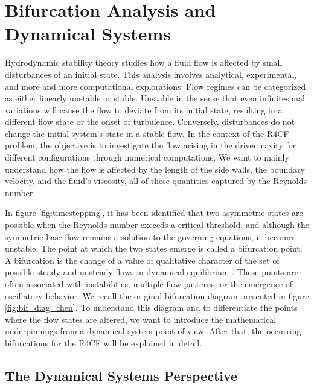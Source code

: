 
\section{Bifurcation Analysis and Dynamical Systems} \label{sec:bif}

Hydrodynamic stability theory studies how a fluid flow is affected by small
disturbances of an initial state. This analysis involves analytical,
experimental, and more and more computational explorations. Flow regimes can be
categorized as either linearly unstable or stable. Unstable in the sense that
even infinitesimal variations will cause the flow to deviate from its initial
state, resulting in a different flow state or the onset of turbulence.
Conversely, disturbances do not change the initial system's state in a stable
flow. In the context of the R4CF problem, the objective is to investigate the
flow arising in the driven cavity for different configurations through
numerical computations. We want to mainly understand how the flow is affected
by the length of the side walls, the boundary velocity, and the fluid's
viscosity, all of these quantities captured by the Reynolds number.

In figure \ref{fig:timestepping}, it has been identified that two asymmetric
states are possible when the Reynolds number exceeds a critical threshold, and
although the symmetric base flow remains a solution to the governing equations,
it becomes unstable. The point at which the two states emerge is called a
bifurcation point. A bifurcation is the change of a value of qualitative
character of the set of possible steady and unsteady flows in dynamical
equilibrium \citep{drazin2002}. These points are often associated with
instabilities, multiple flow patterns, or the emergence of oscillatory
behavior. We recall the original bifurcation diagram presented in figure
\ref{fig:bif_diag_chen}. To understand this diagram and to differentiate the
points where the flow states are altered, we want to introduce the mathematical
underpinnings from a dynamical system point of view. After that, the occurring
bifurcations for the R4CF will be explained in detail.

\subsection{The Dynamical Systems Perspective}


